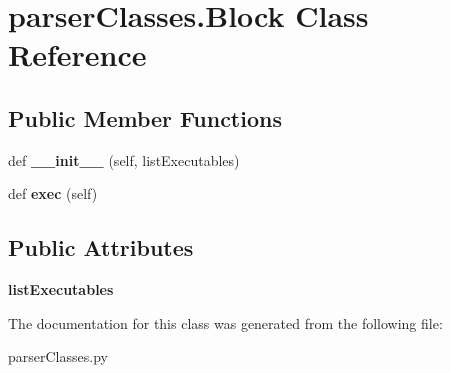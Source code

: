 \hypertarget{classparser_classes_1_1_block}{}\section{parser\+Classes.\+Block Class Reference}
\label{classparser_classes_1_1_block}
\subsection*{Public Member Functions}
\begin{DoxyCompactItemize}
\item 
\mbox{\label{classparser_classes_1_1_block_abcf2dbcf84fade861fdb6796668d7665}} 
def {\bfseries \+\_\+\+\_\+init\+\_\+\+\_\+} (self, list\+Executables)
\item 
\mbox{\label{classparser_classes_1_1_block_a4c3aaea61e8faeb4f83f3c534f6033f7}} 
def {\bfseries exec} (self)
\end{DoxyCompactItemize}
\subsection*{Public Attributes}
\begin{DoxyCompactItemize}
\item 
\mbox{\label{classparser_classes_1_1_block_ae6432948928c58e55813c7ea09f839ad}} 
{\bfseries list\+Executables}
\end{DoxyCompactItemize}


The documentation for this class was generated from the following file\+:\begin{DoxyCompactItemize}
\item 
parser\+Classes.\+py\end{DoxyCompactItemize}
